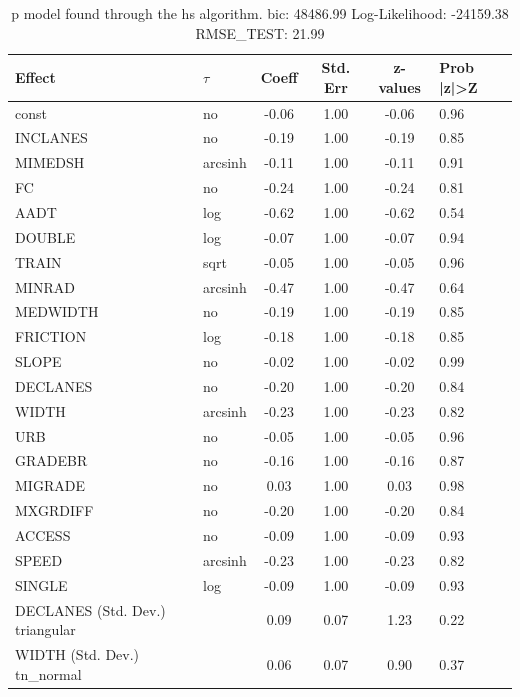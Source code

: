 \begin{table}
	\caption{p model found through the hs algorithm. bic: 48486.99 Log-Likelihood: -24159.38 RMSE_TEST: 21.99}
	\begin{center}
		\begin{tabular}{|l|l|c|c|c|l|}
			\hline
			Effect & $\tau$ & Coeff & Std. Err & z-values & Prob |z|>Z \\
			\hline
			const & no & -0.06 & 1.00 & -0.06 & 0.96 \\
			\hline
			INCLANES & no & -0.19 & 1.00 & -0.19 & 0.85 \\
			\hline
			MIMEDSH & arcsinh & -0.11 & 1.00 & -0.11 & 0.91 \\
			\hline
			FC & no & -0.24 & 1.00 & -0.24 & 0.81 \\
			\hline
			AADT & log & -0.62 & 1.00 & -0.62 & 0.54 \\
			\hline
			DOUBLE & log & -0.07 & 1.00 & -0.07 & 0.94 \\
			\hline
			TRAIN & sqrt & -0.05 & 1.00 & -0.05 & 0.96 \\
			\hline
			MINRAD & arcsinh & -0.47 & 1.00 & -0.47 & 0.64 \\
			\hline
			MEDWIDTH & no & -0.19 & 1.00 & -0.19 & 0.85 \\
			\hline
			FRICTION & log & -0.18 & 1.00 & -0.18 & 0.85 \\
			\hline
			SLOPE & no & -0.02 & 1.00 & -0.02 & 0.99 \\
			\hline
			DECLANES & no & -0.20 & 1.00 & -0.20 & 0.84 \\
			\hline
			WIDTH & arcsinh & -0.23 & 1.00 & -0.23 & 0.82 \\
			\hline
			URB & no & -0.05 & 1.00 & -0.05 & 0.96 \\
			\hline
			GRADEBR & no & -0.16 & 1.00 & -0.16 & 0.87 \\
			\hline
			MIGRADE & no & 0.03 & 1.00 & 0.03 & 0.98 \\
			\hline
			MXGRDIFF & no & -0.20 & 1.00 & -0.20 & 0.84 \\
			\hline
			ACCESS & no & -0.09 & 1.00 & -0.09 & 0.93 \\
			\hline
			SPEED & arcsinh & -0.23 & 1.00 & -0.23 & 0.82 \\
			\hline
			SINGLE & log & -0.09 & 1.00 & -0.09 & 0.93 \\
			\hline
			DECLANES (Std. Dev.) triangular &  & 0.09 & 0.07 & 1.23 & 0.22 \\
			\hline
			WIDTH (Std. Dev.) tn_normal &  & 0.06 & 0.07 & 0.90 & 0.37 \\

\end{tabular}
\end{center}
\end{table}
